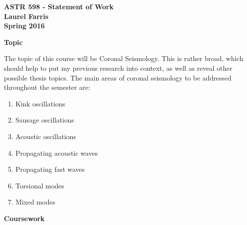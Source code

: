 \documentclass[12pt]{article}
\begin{document}
\begin{centering}
    \Large\textbf{ASTR 598 - Statement of Work\\}
    \vspace{0.5em}
    \large\textbf{Laurel Farris\\}
    \vspace{0.25em}
    \large\textbf{Spring 2016\\}
    \vspace{0.25em}
\end{centering}


\large\textbf{Topic}\normalsize

The topic of this course will be Coronal Seismology. This is
rather broad, which should help to put my previous research into context,
as well as reveal other possible thesis topics.
The main areas of coronal seismology to be addressed throughout the
semester are:
\begin{enumerate}
    \item Kink oscillations
    \item Sausage oscillations
    \item Acoustic oscillations
    \item Propagating acoustic waves
    \item Propagating fast waves
    \item Torsional modes
    \item Mixed modes
\end{enumerate}

\large\textbf{Coursework}\normalsize
\end{document}
